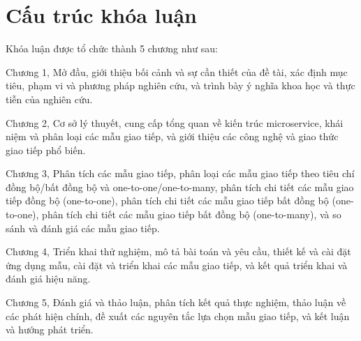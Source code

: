 \section{Cấu trúc khóa luận}
Khóa luận được tổ chức thành 5 chương như sau: 

Chương 1, Mở đầu, giới thiệu bối
cảnh và sự cần thiết của đề tài, xác định mục tiêu, phạm vi và phương pháp
nghiên cứu, và trình bày ý nghĩa khoa học và thực tiễn của nghiên cứu. 

Chương 2, Cơ sở lý thuyết, cung cấp tổng quan về kiến trúc microservice, khái niệm và
phân loại các mẫu giao tiếp, và giới thiệu các công nghệ và giao thức giao tiếp
phổ biến. 

Chương 3, Phân tích các mẫu giao tiếp, phân loại các mẫu giao tiếp
theo tiêu chí đồng bộ/bất đồng bộ và one-to-one/one-to-many, phân tích chi tiết
các mẫu giao tiếp đồng bộ (one-to-one), phân tích chi tiết các mẫu giao tiếp
bất đồng bộ (one-to-one), phân tích chi tiết các mẫu giao tiếp bất đồng bộ
(one-to-many), và so sánh và đánh giá các mẫu giao tiếp. 

Chương 4, Triển khai
thử nghiệm, mô tả bài toán và yêu cầu, thiết kế và cài đặt ứng dụng mẫu, cài
đặt và triển khai các mẫu giao tiếp, và kết quả triển khai và đánh giá hiệu
năng. 

Chương 5, Đánh giá và thảo luận, phân tích kết quả thực nghiệm, thảo luận
về các phát hiện chính, đề xuất các nguyên tắc lựa chọn mẫu giao tiếp, và kết
luận và hướng phát triển.